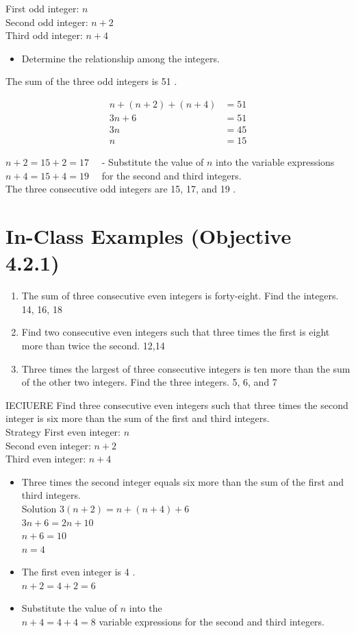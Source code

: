 \documentclass{ximera}
\begin{document}
First odd integer: $n$\\
Second odd integer: $n+2$\\
Third odd integer: $n+4$

\begin{itemize}
  \item Determine the relationship among the integers.
\end{itemize}

The sum of the three odd integers is 51 .

$$\begin{aligned}
n+(n+2)+(n+4) & =51 \\
3 n+6 & =51 \\
3 n & =45 \\
n & =15
\end{aligned}$$

$n+2=15+2=17 \quad$ - Substitute the value of $n$ into the variable expressions $n+4=15+4=19 \quad$ for the second and third integers.\\
The three consecutive odd integers are 15, 17, and 19 .

\section*{In-Class Examples (Objective 4.2.1)}
\begin{enumerate}
  \item The sum of three consecutive even integers is forty-eight. Find the integers. 14, 16, 18
  \item Find two consecutive even integers such that three times the first is eight more than twice the second. 12,14
  \item Three times the largest of three consecutive integers is ten more than the sum of the other two integers. Find the three integers. 5, 6, and 7
\end{enumerate}

IECIUERE Find three consecutive even integers such that three times the second integer is six more than the sum of the first and third integers.\\
Strategy First even integer: $n$\\
Second even integer: $n+2$\\
Third even integer: $n+4$

\begin{itemize}
  \item Three times the second integer equals six more than the sum of the first and third integers.\\
Solution $3(n+2)=n+(n+4)+6$\\
$3 n+6=2 n+10$\\
$n+6=10$\\
$n=4$
  \item The first even integer is 4 .\\
$n+2=4+2=6$
  \item Substitute the value of $n$ into the\\
$n+4=4+4=8$ variable expressions for the second and third integers.
\end{itemize}
\end{document}
